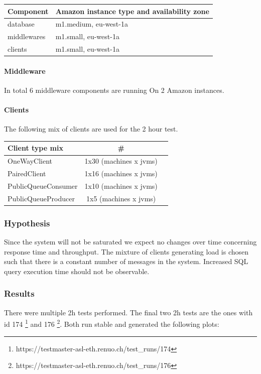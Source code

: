 \documentclass[milestone1.tex]{subfiles}
\begin{document}
\begin{tabular}{|l|l|}
\hline 
Component & Amazon instance type and availability zone \\
\hline 
database & m1.medium, eu-west-1a \\ 
middlewares & m1.small, eu-west-1a \\ 
clients & m1.small, eu-west-1a \\ 
\hline 
\end{tabular}


\paragraph{Middleware} In total 6 middleware components are running On 2 Amazon instances.

\paragraph{Clients} The following mix of clients are used for the 2 hour test.

\begin{tabular}{|l|c|c|}
\hline 
Client type mix & \# \\ 
\hline 
OneWayClient & 1x30 (machines x jvms)  \\ 
\hline 
PairedClient & 1x16 (machines x jvms) \\ 
\hline 
PublicQueueConsumer & 1x10 (machines x jvms) \\ 
\hline 
PublicQueueProducer & 1x5 (machines x jvms) \\ 
\hline 
\end{tabular} 


\subsubsection{Hypothesis}
Since the system will not be saturated we expect no changes over time concerning response time and throughput. The mixture of clients generating load is chosen such that there is a constant number of messages in the system. Increased SQL query execution time should not be observable.

\subsubsection{Results}
There were multiple 2h tests performed. The final two 2h tests are the ones with id 174 \footnote{https://testmaster-asl-eth.renuo.ch/test\_runs/174} and 176 \footnote{https://testmaster-asl-eth.renuo.ch/test\_runs/176}. Both run stable and generated the following plots:
\end{document}
